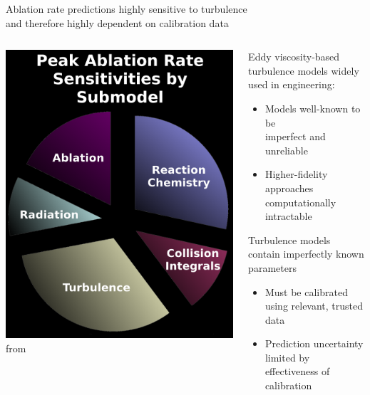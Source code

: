 \documentclass[mathserif]{beamer}
\begin{document}
\begin{frame}{%
  Ablation rate predictions highly sensitive to turbulence\\
  and therefore highly dependent on calibration data
}
\begin{columns}[c,onlytextwidth]
\begin{column}{.49\linewidth}
  \begin{center}
    \includegraphics[width=0.85\linewidth]{sensitivity_by_submodel_portrait}
    \\
    from \citet{Stogner2011Uncertainty}
  \end{center}
\end{column}
\begin{column}{.49\linewidth}
  Eddy viscosity-based turbulence models widely used in engineering:
  \begin{itemize}
    \item Models well-known to be\\imperfect and unreliable
    \item Higher-fidelity approaches computationally intractable
  \end{itemize}
  \vfill
  Turbulence models contain imperfectly known parameters
  \begin{itemize}
    \item Must be calibrated using relevant, trusted data
    \item Prediction uncertainty limited by effectiveness of calibration
  \end{itemize}
\end{column}
\end{columns}
\end{frame}
\end{document}

